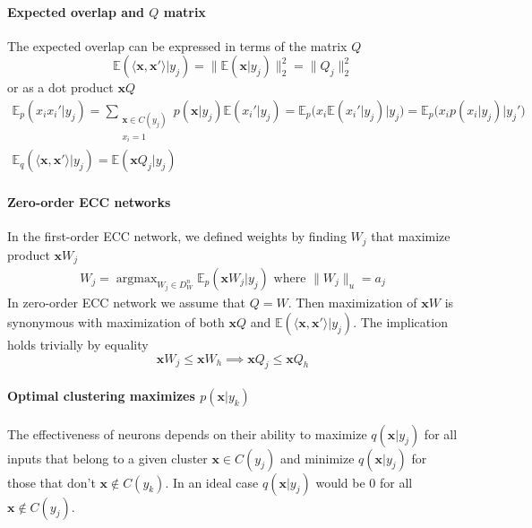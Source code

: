 \documentclass[12pt]{article}
\DeclareMathOperator*{\argmax}{argmax}
\begin{document}
\paragraph{Expected overlap and $Q$ matrix} 
The expected overlap can be expressed in terms of the matrix $Q$
\[
\mathbb{E}(\langle \boldsymbol{x}, \boldsymbol{x}'\rangle|y_j) = \lVert \mathbb{E}(\boldsymbol{x}|y_j) \rVert_2^2 =  \lVert Q_j \rVert_2^2
\]
or as a dot product $\boldsymbol{x}Q$
\begin{gather*}
	\mathbb{E}_p(x_i x_i' | y_j) = 
	\sum_{\substack{\boldsymbol{x}\in C(y_j) \\ x_i=1}} p(\boldsymbol{x}|y_j) \mathbb{E}(x_i'|y_j)= \mathbb{E}_p\big(x_i \mathbb{E}(x_i'|y_j) \big| y_j\big) = \mathbb{E}_p\big(x_i p(x_i|y_j) \big| y_j'\big)\\
	\mathbb{E}_q(\langle \boldsymbol{x}, \boldsymbol{x}'\rangle|y_j) = \mathbb{E}(\boldsymbol{x} Q_j | y_j)
\end{gather*}

\paragraph{Zero-order ECC networks}
In the first-order ECC network, we defined weights by finding $W_j$ that maximize product $\boldsymbol{x}W_j$
\begin{gather*}
	W_j = \argmax_{W_j\in D_W^{n}} \mathbb{E}_p(\boldsymbol{x}W_j|y_j)\text{ where } \lVert W_j \rVert_u=a_j
\end{gather*}
In zero-order ECC network we assume that $Q=W$. Then maximization of $\boldsymbol{x}W$ is synonymous with maximization of both $\boldsymbol{x}Q$ and $\mathbb{E}(\langle \boldsymbol{x}, \boldsymbol{x}'\rangle|y_j) $. 
The implication holds trivially by equality
\[
\boldsymbol{x}W_j \le \boldsymbol{x}W_h  \implies  \boldsymbol{x}Q_j \le \boldsymbol{x}Q_h 
\]
\paragraph{Optimal clustering maximizes $p(\boldsymbol{x}|y_k)$} 
The effectiveness of neurons depends on their ability to maximize $q(\boldsymbol{x}|y_j)$ for all inputs that belong to a given cluster $\boldsymbol{x}\in C(y_j)$ and minimize $q(\boldsymbol{x}|y_j)$ for those that don't  $\boldsymbol{x}\notin C(y_k)$. In an ideal case $q(\boldsymbol{x}|y_j)$ would be $0$ for all $\boldsymbol{x}\notin C(y_j)$. 
\end{document}
